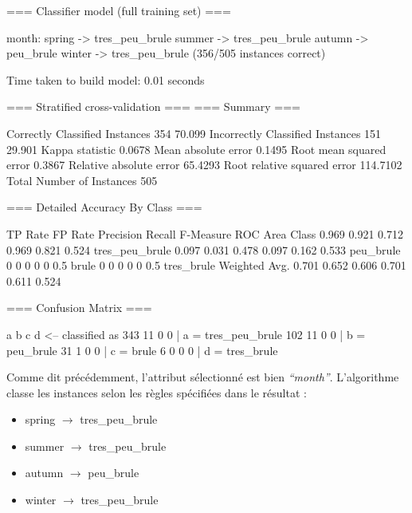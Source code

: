 \documentclass{article}
\begin{document}
\begin{sffamily}
\begin{center}
\begin{boxedverbatim}
=== Classifier model (full training set) ===

month:
	spring	-> tres_peu_brule
	summer	-> tres_peu_brule
	autumn	-> peu_brule
	winter	-> tres_peu_brule
(356/505 instances correct)


Time taken to build model: 0.01 seconds

=== Stratified cross-validation ===
=== Summary ===

Correctly Classified Instances         354               70.099  %
Incorrectly Classified Instances       151               29.901  %
Kappa statistic                          0.0678
Mean absolute error                      0.1495
Root mean squared error                  0.3867
Relative absolute error                 65.4293 %
Root relative squared error            114.7102 %
Total Number of Instances              505     

=== Detailed Accuracy By Class ===

             TP Rate  FP Rate  Precision  Recall  F-Measure  ROC Area  Class
              0.969    0.921     0.712     0.969    0.821     0.524    tres_peu_brule
              0.097    0.031     0.478     0.097    0.162     0.533    peu_brule
              0        0         0         0        0         0.5      brule
              0        0         0         0        0         0.5      tres_brule
Weighted Avg. 0.701    0.652     0.606     0.701    0.611     0.524

=== Confusion Matrix ===

   a   b   c   d   <-- classified as
 343  11   0   0 |   a = tres_peu_brule
 102  11   0   0 |   b = peu_brule
  31   1   0   0 |   c = brule
   6   0   0   0 |   d = tres_brule

	\end{boxedverbatim}
\end{center}

Comme dit précédemment, l'attribut sélectionné est bien \textit{``month''}. L'algorithme classe les instances selon les règles 
spécifiées dans le résultat :
\begin{itemize}
\item spring $\rightarrow$ tres\_peu\_brule
\item summer $\rightarrow$ tres\_peu\_brule
\item autumn $\rightarrow$ peu\_brule
\item winter $\rightarrow$ tres\_peu\_brule \\
\end{itemize}


\end{sffamily}
\end{document}
